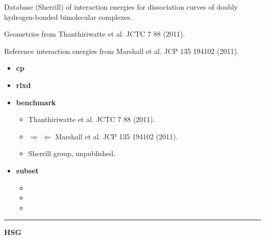 \documentclass[letterpaper,10pt,english]{sphinxmanual}
\begin{document}
\begin{DUlineblock}{0em}
\item[] Database (Sherrill) of interaction energies for dissociation curves of doubly hydrogen-bonded bimolecular complexes.
\item[] Geometries from Thanthiriwatte et al. JCTC 7 88 (2011).
\item[] Reference interaction energies from Marshall et al. JCP 135 194102 (2011).
\end{DUlineblock}
\begin{itemize}
\item {} 
\textbf{cp}   \textbar{}\textbar{} 

\item {} 
\textbf{rlxd}  \textbar{}\textbar{} 

\item {} 
\textbf{benchmark}
\begin{itemize}
\item {} 
 Thanthiriwatte et al. JCTC 7 88 (2011).

\item {} 
$\Rightarrow$  $\Leftarrow$ Marshall et al. JCP 135 194102 (2011).

\item {} 
 Sherrill group, unpublished.

\end{itemize}

\item {} 
\textbf{subset}
\begin{itemize}
\item {} 

\item {} 

\item {} 

\end{itemize}

\end{itemize}


\bigskip\hrule{}\bigskip

\label{index:module-HSG}
\textbf{HSG}
\end{document}
